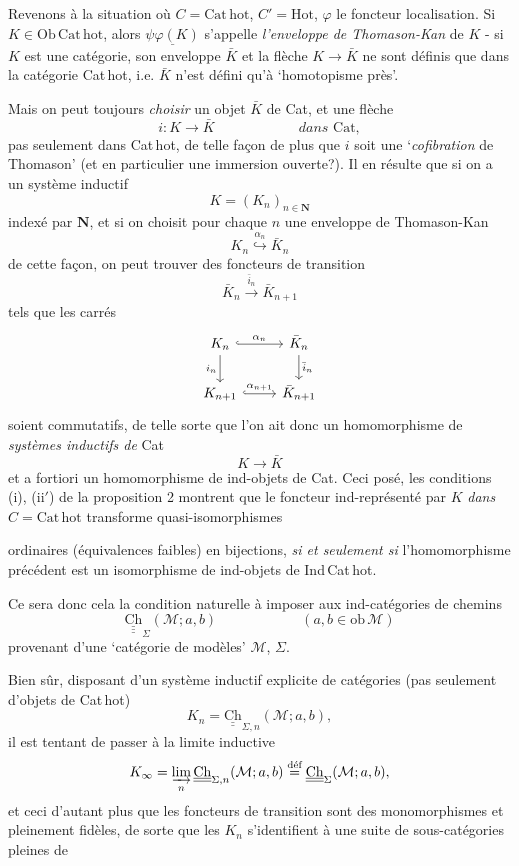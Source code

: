 \documentclass[11pt]{article}
\newcommand{\printedpage}[1]{\marginpar{\footnotesize p.~#1}}
\newcommand{\msp}[1]{\marginpar{\footnotesize [#1]}}
\newcommand{\Hot}{\mathrm{Hot}}
\newcommand{\Ob}{\mathrm{Ob}\,}
\newcommand{\Ch}{\underline{\mathrm{Ch}}}
\newcommand{\Cathot}{\mathrm{Cat\,hot}}
\newcommand{\Cat}{\mathrm{Cat}}
\begin{document}
Revenons à la situation où $C = \Cathot$, $C' = \Hot$, $\varphi$ le foncteur localisation. Si $K \in \Ob\Cathot$, alors $\underline{\psi\varphi(K)}$ s'appelle \textit{l'enveloppe de Thomason-Kan} de $K$ - si $K$ est une catégorie, son enveloppe $\bar{K}$ et la flèche $K \longrightarrow \bar{K}$ ne sont définis que dans la catégorie Cat\,hot, i.e. $\bar{K}$ n'est défini qu'à `homotopisme près'. %

\noindent\msp{page 43}%
Mais on peut toujours \textit{choisir} un objet $\bar{K}$ de Cat, et une flèche
\[
i : K \longrightarrow \bar{K} \qquad\qquad\qquad \textit{dans } \Cat,
\]
\printedpage{28}
pas seulement dans Cat\,hot, de telle façon de plus que $i$ soit une `\textit{cofibration} de Thomason' (et en particulier une immersion ouverte?). Il en résulte que si on a un système inductif
\[
K = (K_n)_{n\in\mathbf{N}}
\]
indexé par $\mathbf{N}$, et si on choisit pour chaque $n$ une enveloppe de Thomason-Kan
\[
K_n \overset{\alpha_n}{\hookrightarrow} \bar{K}_n
\]
de cette façon, on peut trouver des foncteurs de transition
\[
\bar{K}_n \xrightarrow{\bar{i}_n} \bar{K}_{n+1}
\]
tels que les carrés
\[
\begin{tikzcd}
K_n \arrow[r,hook,"\alpha_n"] \arrow[d,"i_n"'] & \bar{K}_n \arrow[d,"\bar{i}_n"] \\
K_{n+1} \arrow[r,hook,"\alpha_{n+1}"] & \bar{K}_{n+1}
\end{tikzcd}
\]
soient commutatifs, de telle sorte que l'on ait donc un homomorphisme de \textit{systèmes inductifs de} Cat
\[
K \longrightarrow \bar{K}
\]
et a fortiori un homomorphisme de ind-objets de Cat. Ceci posé, les conditions (i), (ii$'$) de la proposition 2 montrent que le foncteur ind-représenté par $K$ \textit{dans} $C = \Cathot$ transforme quasi-isomorphismes

\noindent\msp{page 44}%
ordinaires (équivalences faibles) en bijections, \textit{si et seulement si} l'homomorphisme précédent est un isomorphisme de ind-objets de Ind\,Cat\,hot.

Ce sera donc cela la condition naturelle à imposer aux ind-catégories de chemins
\[
\underline{\underline{\Ch}}_{\Sigma}(\mathcal{M};a,b) \qquad\qquad\qquad (a,b \in \mathrm{ob}\,\mathcal{M})
\]
provenant d'une `catégorie de modèles' $\mathcal{M}$, $\Sigma$.

Bien sûr, disposant d'un système inductif explicite de catégories (pas seulement d'objets de Cat\,hot)
\[
K_n = \underline{\Ch}_{\Sigma,n}(\mathcal{M};a,b),
\]
il est tentant de passer à la limite inductive
\[
K_\infty = \varinjlim_n \underline{\Ch}_{\Sigma,n}(\mathcal{M};a,b) \overset{\text{déf}}{=} \underline{\Ch}_{\Sigma}(\mathcal{M};a,b),
\]
et ceci d'autant plus que les foncteurs de transition sont des monomorphismes et pleinement fidèles, de sorte que les $K_n$ s'identifient à une suite de sous-catégories pleines de
\end{document}
